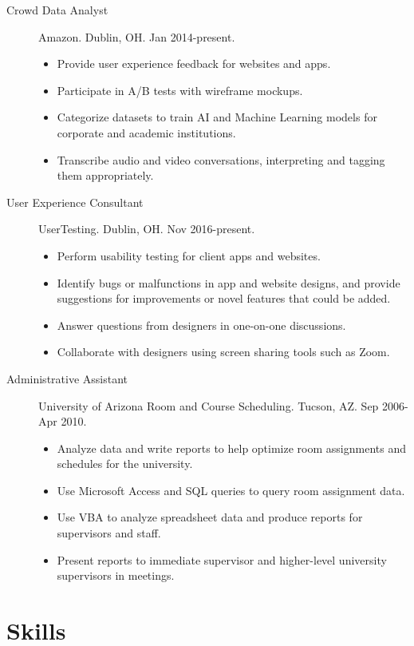 \documentclass{article}
\begin{document}
\begin{description}
  \item[Crowd Data Analyst] Amazon. Dublin, OH. Jan 2014-present.
  \begin{itemize}
    \item Provide user experience feedback for websites and apps.
    \item Participate in A/B tests with wireframe mockups.
    \item Categorize datasets to train AI and Machine Learning models for corporate and academic institutions.
    \item Transcribe audio and video conversations, interpreting and tagging them appropriately.
  \end{itemize}
  \item[User Experience Consultant] UserTesting. Dublin, OH. Nov 2016-present.
  \begin{itemize}
    \item Perform usability testing for client apps and websites.
    \item Identify bugs or malfunctions in app and website designs, and provide suggestions for improvements or novel features that could be added.
    \item Answer questions from designers in one-on-one discussions.
    \item Collaborate with designers using screen sharing tools such as Zoom.
  \end{itemize}  
  \item[Administrative Assistant] University of Arizona Room and Course Scheduling. Tucson, AZ. Sep 2006-Apr 2010.
  \begin{itemize}
    \item Analyze data and write reports to help optimize room assignments and schedules for the university.
    \item Use Microsoft Access and SQL queries to query room assignment data.
    \item Use VBA to analyze spreadsheet data and produce reports for supervisors and staff.
    \item Present reports to immediate supervisor and higher-level university supervisors in meetings.
  \end{itemize}
\end{description}

\vspace{-1em}
\section*{Skills}\vspace{-0.5em}
\end{document}
